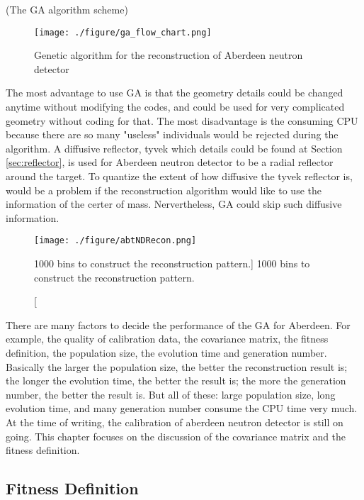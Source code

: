 (The GA algorithm scheme)
\begin{figure}
    \centering
    \texttt{[image: ./figure/ga\_flow\_chart.png]}
    \caption{Genetic algorithm for the reconstruction of Aberdeen neutron detector}
    \label{ga_flow_chart.png}
    \end{figure}


The most advantage to use GA is that the geometry details could be changed anytime without modifying the codes,
and could be used for very complicated geometry without coding for that. The most disadvantage is the consuming
CPU because there are so many "useless" individuals would be rejected during the algorithm.
A diffusive reflector, tyvek which details could be found at Section \ref{sec:reflector}, is used for Aberdeen neutron detector to
be a radial reflector around the target. To quantize the extent of how diffusive the tyvek reflector is, would be a problem
if the reconstruction algorithm would like to use the information of the certer of mass.
Nervertheless, GA could skip such diffusive information.


\begin{figure}[h]
    \centering
    \texttt{[image: ./figure/abtNDRecon.png]}
    \caption
    [1000 bins to construct the reconstruction pattern.]
    {1000 bins to construct the reconstruction pattern.}
    \label{fig:abtNDRecon.png}
    \end{figure}



There are many factors to decide the performance of the GA for Aberdeen.
For example, the quality of calibration data, the covariance matrix, the fitness definition,
the population size, the evolution time and generation number.
Basically the larger the population size, the better the reconstruction result is; the longer the evolution time, the better the result is;
the more the generation number, the better the result is. But all of these: large population size, long evolution time, and many generation
number consume the CPU time very much.
At the time of writing, the calibration of aberdeen neutron detector is still on going.
This chapter focuses on the discussion of the covariance matrix and the fitness definition.














\subsection{Fitness Definition}


